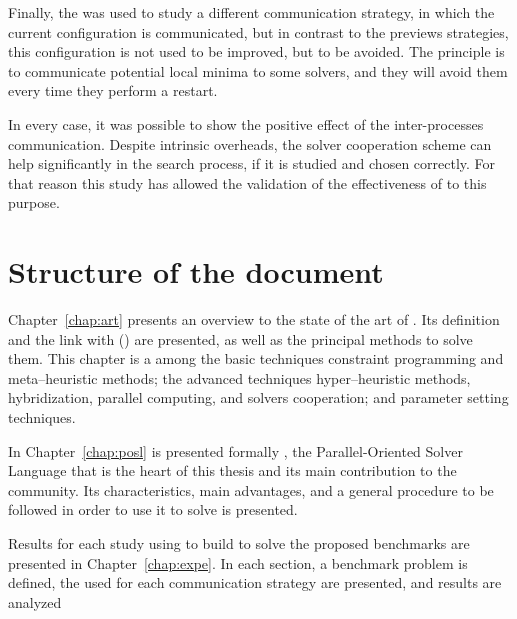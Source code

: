 Finally, the \grp{} was used to study a different communication strategy, in which the current configuration is communicated, but in contrast to the previews strategies, this configuration is not used to be improved, but to be avoided. The principle is to communicate potential local minima to some solvers, and they will avoid them every time they perform a restart. 

In every case, it was possible to show the positive effect of the inter-processes communication. Despite intrinsic overheads, the solver cooperation scheme can help significantly in the search process, if it is studied and chosen correctly. For that reason this study has allowed the validation of the effectiveness of \posl{} to this purpose.

\section{Structure of the document}

Chapter~\ref{chap:art} presents an overview to the state of the art of \COPs{}. Its definition and the link with \CSPs{} (\csp) are presented, as well as the principal methods to solve them. This chapter is a  among the basic techniques constraint programming and meta--heuristic methods; the advanced techniques hyper--heuristic methods, hybridization, parallel computing, and solvers cooperation; and parameter setting techniques.


In Chapter~\ref{chap:posl} is presented formally \posl, the Parallel-Oriented Solver Language that is the heart of this thesis and its main contribution to the community. Its characteristics, main advantages, and a general procedure to be followed in order to use it to solve \CSPs{} is
presented.

Results for each study using \posl{} to build \comstrs{} to solve the proposed benchmarks are presented in Chapter~\ref{chap:expe}. In each section, a benchmark problem is defined, the used \soset{} for each communication strategy are presented, and results are analyzed %


